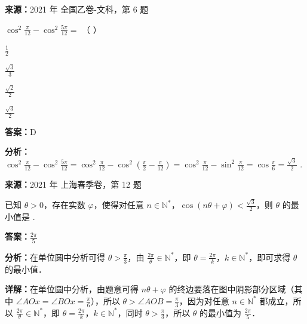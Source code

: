 \begin{question}[points=5]
\textbf{来源：}2021 年 全国乙卷-文科，第 6 题\par
$\cos^2\frac{\pi}{12} - \cos^2\frac{5\pi}{12} =$ （ ）
\begin{choices}
  \item $\frac{1}{2}$
  \item $\frac{\sqrt{3}}{3}$
  \item $\frac{\sqrt{2}}{2}$
  \item $\frac{\sqrt{3}}{2}$
\end{choices}
\begin{solution}
\textbf{答案：}D

\textbf{分析：}$\cos^2\frac{\pi}{12} - \cos^2\frac{5\pi}{12} = \cos^2\frac{\pi}{12} - \cos^2\left(\frac{\pi}{2} - \frac{\pi}{12}\right) = \cos^2\frac{\pi}{12} - \sin^2\frac{\pi}{12} = \cos\frac{\pi}{6} = \frac{\sqrt{3}}{2}$ .
\end{solution}
\end{question}

\begin{question}[points=5]
\textbf{来源：}2021 年 上海春季卷，第 12 题\par
已知 $\theta>0$，存在实数 $\varphi$，使得对任意 $n\in\mathbb{N}^*$，$\cos(n\theta+\varphi)<\frac{\sqrt{3}}{2}$，则 $\theta$ 的最小值是  .
\fillin[{$\frac{2\pi}{5}$}]
\begin{solution}
\textbf{答案：}$\frac{2\pi}{5}$

\textbf{分析：}在单位圆中分析可得 $\theta>\frac{\pi}{3}$，由 $\frac{2\pi}{\theta}\in\mathbb{N}^*$，即 $\theta=\frac{2\pi}{k}$，$k\in\mathbb{N}^*$，即可求得 $\theta$ 的最小值．

\textbf{详解：}在单位圆中分析，由题意可得 $n\theta+\varphi$ 的终边要落在图中阴影部分区域（其中 $\angle AOx=\angle BOx=\frac{\pi}{6}$），所以 $\theta>\angle AOB=\frac{\pi}{3}$，因为对任意 $n\in\mathbb{N}^*$ 都成立，所以 $\frac{2\pi}{\theta}\in\mathbb{N}^*$，即 $\theta=\frac{2\pi}{k}$，$k\in\mathbb{N}^*$，同时 $\theta>\frac{\pi}{3}$，所以 $\theta$ 的最小值为 $\frac{2\pi}{5}$．
\end{solution}
\end{question}

